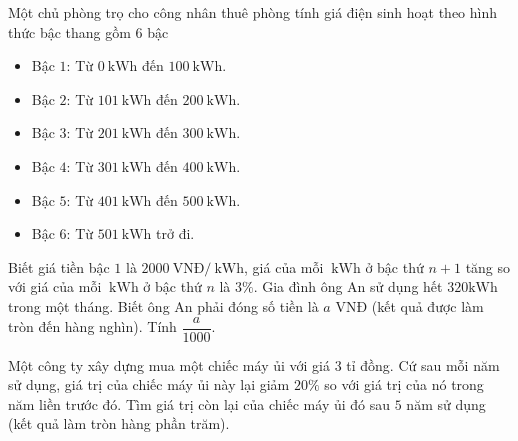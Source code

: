 \begin{bt}%
 
	Một chủ phòng trọ cho công nhân thuê phòng tính giá điện sinh hoạt theo hình thức bậc thang gồm $6$ bậc
	\begin{itemize}
		\item Bậc $1$: Từ $0\mathrm{~kWh}$ đến $100 \mathrm{~kWh}$.
		\item Bậc $2$: Từ $101\mathrm{~kWh}$ đến $200 \mathrm{~kWh}$.
		\item Bậc $3$: Từ $201\mathrm{~kWh}$ đến $300\mathrm{~kWh}$.
		\item  Bậc $4$: Từ $301\mathrm{~kWh}$ đến $400 \mathrm{~kWh}$.
		\item Bậc $5$: Từ $401\mathrm{~kWh}$ đến $500 \mathrm{~kWh}$.
		\item  Bậc $6$: Từ $501 \mathrm{~kWh}$ trở đi.
	\end{itemize}    
	Biết giá tiền bậc $1$ là $2000 \mathrm{~VNĐ}/ \mathrm{~kWh}$, giá của mỗi $\mathrm{~kWh}$ ở bậc thứ $n+1$ tăng so với giá của mỗi $\mathrm{~kWh}$ ở bậc thứ $n$ là $3 \%$. Gia đình ông An sử dụng hết $320 \mathrm{kWh}$ trong một tháng. Biết ông An phải đóng số tiền là $a$ VNĐ (kết quả được làm tròn đến hàng nghìn). Tính $\dfrac{a}{1000}$. 
\end{bt}

\begin{bt}%
   
	Một công ty xây dựng mua một chiếc máy ủi với giá $3$ tỉ đồng. Cứ sau mỗi năm sử dụng, giá trị của chiếc máy ủi này lại giảm $20 \%$ so với giá trị của nó trong năm liền trước đó. Tìm giá trị còn lại của chiếc máy ủi đó sau $5$ năm sử dụng (kết quả làm tròn hàng phần trăm).
\end{bt}

